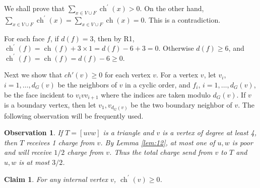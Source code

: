 \documentclass{article}
\newtheorem{claim}{Claim}
\newtheorem{observation}{Observation}
\begin{document}
We shall prove that   $ \sum_{x \in V \cup F} \operatorname{ch}^{\prime}(x) >0$.
On the other hand,  $\sum_{x \in V \cup F} \operatorname{ch}^{\prime}(x) = \sum_{x \in V \cup F} \operatorname{ch} (x) =0$. This  is a contradiction.  

 For each face $f$,  if $d(f) = 3$,  then by R1, $\operatorname{ch}^{\prime}(f)=\operatorname{ch}(f)+3\times1=d(f)-6 + 3=0$. Otherwise $d(f)\ge 6$, and  $\operatorname{ch}^{\prime}(f)=\operatorname{ch}(f)=d(f)-6\ge 0$.

Next we show that $ch'(v) \ge 0$ for each vertex $v$.
For a vertex $v$, let $v_i$, $i = 1,\ldots,d_G(v)$ be the neighbors of $v$ in a cyclic order, 
and $f_i$, $i = 1,\ldots,d_G(v)$, be the face incident to $v_ivv_{i + 1}$ 
where the indices are taken modulo $d_G(v)$.  If $v$ is a boundary vertex, then let $v_1, v_{d_G(v)}$ be the two boundary neighbor of $v$. The following observation will be frequently used.

\begin{observation}
    \label{ob-triangle}
    If $T=[uvw]$ is a triangle and $v$ is a vertex of degree at least 4, then $T$ receives 1 charge from $v$. By Lemma \ref{lem:12}, at most one of $u,w$ is poor and will receive $1/2$ charge from $v$. Thus the total charge send from $v$ to $T$ and $u,w$ is at most $3/2$.
\end{observation}


 
\begin{claim}
    For any internal vertex $v$, $\operatorname{ch}^{\prime}(v)\ge 0$.
\end{claim}
\end{document}
